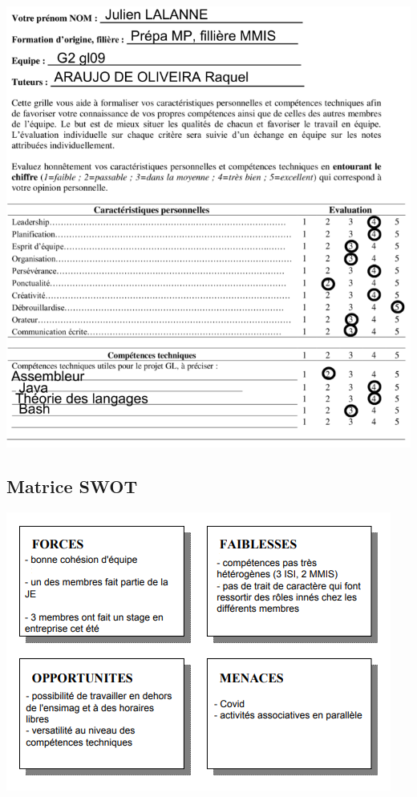 \documentclass[12pt,a4paper,twoside]{article}
\begin{document}
		\newpage
		\includegraphics[width=1\textwidth]{Evaluation_Julien.png}
		\newpage
		
		\subsection{Matrice SWOT}
		
		\includegraphics{SWOT.png}
	
\end{document}
